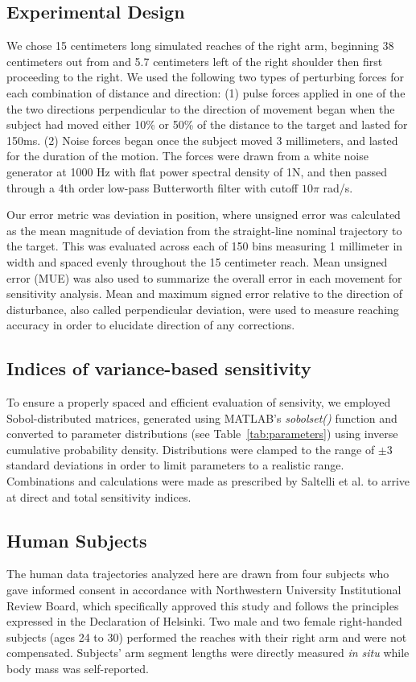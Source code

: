 \documentclass[10pt]{article}
\begin{document}
\subsection*{Experimental Design}
We chose 15 centimeters long simulated reaches of the right arm, beginning 38 centimeters out from and 5.7 centimeters left of the right shoulder then first proceeding to the right.  We used the following two types of perturbing forces for each combination of distance and direction: 
(1) pulse forces applied in one of the the two directions perpendicular to the direction of movement began when the subject had moved either 10\% or 50\% of the distance to the target and lasted for 150ms.
(2) Noise forces began once the subject moved 3 millimeters, and lasted for the duration of the motion. The forces were drawn from a white noise generator at 1000 Hz with flat power spectral density of 1N, and then passed through a 4th order low-pass Butterworth filter with cutoff $10 \pi$ rad/s.

Our error metric was deviation in position, where unsigned error was calculated as the mean magnitude of deviation from the straight-line nominal trajectory to the target. This was evaluated across each of 150 bins measuring 1 millimeter in width and spaced evenly throughout the 15 centimeter reach. Mean unsigned error (MUE) was also used to summarize the overall error in each movement for sensitivity analysis. Mean and maximum signed error relative to the direction of disturbance, also called perpendicular deviation, were used to measure reaching accuracy in order to elucidate direction of any corrections.

\subsection*{Indices of variance-based sensitivity}
To ensure a properly spaced and efficient evaluation of sensivity, we employed Sobol-distributed matrices, generated using MATLAB's \textit{sobolset()} function and converted to parameter distributions (see Table~\ref{tab:parameters}) using inverse cumulative probability density. Distributions were clamped to the range of $\pm3$ standard deviations in order to limit parameters to a realistic range. Combinations and calculations were made as prescribed by Saltelli et al. \cite{saltelli2010variance} to arrive at direct and total sensitivity indices.

\subsection*{Human Subjects}
The human data trajectories analyzed here are drawn from four subjects who gave informed consent in accordance with Northwestern University Institutional Review Board, which specifically approved this study and follows the principles expressed in the Declaration of Helsinki. Two male and two female right-handed subjects (ages 24 to 30) performed the reaches with their right arm and were not compensated. Subjects' arm segment lengths were directly measured \textit{in situ} while body mass was self-reported. 
\end{document}
